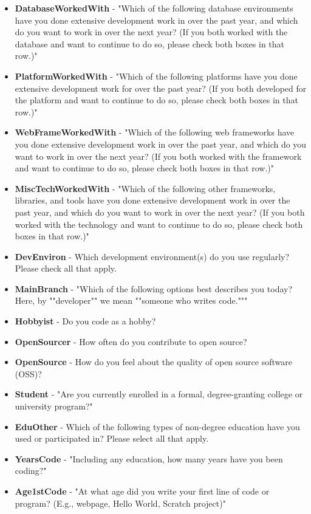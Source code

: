 \begin{appendices}
\begin{itemize}
        \item \textbf{DatabaseWorkedWith} - "Which of the following database environments have you done extensive development work in over the past year, and which do you want to work in over the next year?   (If you both worked with the database and want to continue to do so, please check both boxes in that row.)"
        \item \textbf{PlatformWorkedWith} - "Which of the following platforms have you done extensive development work for over the past year?   (If you both developed for the platform and want to continue to do so, please check both boxes in that row.)"
        \item \textbf{WebFrameWorkedWith} - "Which of the following web frameworks have you done extensive development work in over the past year, and which do you want to work in over the next year? (If you both worked with the framework and want to continue to do so, please check both boxes in that row.)"
        \item \textbf{MiscTechWorkedWith} - "Which of the following other frameworks, libraries, and tools have you done extensive development work in over the past year, and which do you want to work in over the next year? (If you both worked with the technology and want to continue to do so, please check both boxes in that row.)"
        \item \textbf{DevEnviron} - Which development environment(s) do you use regularly? Please check all that apply.
        \item \textbf{MainBranch} - "Which of the following options best describes you today? Here, by ""developer"" we mean ""someone who writes code."""
        \item \textbf{Hobbyist} - Do you code as a hobby?
        \item \textbf{OpenSourcer} - How often do you contribute to open source?
        \item \textbf{OpenSource} - How do you feel about the quality of open source software (OSS)?
        \item \textbf{Student} - "Are you currently enrolled in a formal, degree-granting college or university program?"
        \item \textbf{EduOther} - Which of the following types of non-degree education have you used or participated in? Please select all that apply.
        \item \textbf{YearsCode} - "Including any education, how many years have you been coding?"
        \item \textbf{Age1stCode} - "At what age did you write your first line of code or program? (E.g., webpage, Hello World, Scratch project)"

\end{itemize}
\end{appendices}
